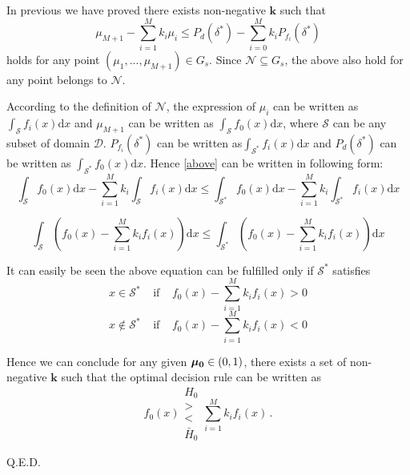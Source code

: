 \documentclass[12pt,journal,a4paper,twoside,onecolumn]{IEEEtran}
\begin{document}
\begin{spacing}{2.5}
In previous we have proved there exists non-negative $\mathbf{k}$ such that 
\begin{equation}
\label{above}
\mu_{M+1} - \sum_{i=1}^{M}k_i\mu_i \leq P_d(\delta^\ast) - \sum_{i=0}^{M}k_iP_{f_i}(\delta^\ast)
\end{equation}
holds for any point $(\mu_1, ..., \mu_{M+1}) \in G_s$. Since $\mathcal{N} \subseteq G_s$, the above also hold for any point belongs to $\mathcal{N}$.

According to the definition of $\mathcal{N}$, the expression of $\mu_i$  can be written as $\int_{\mathcal{S}}f_i(x)\mathrm{d}x$ and $\mu_{M+1}$ can be written as $\int_{\mathcal{S}}f_{0}(x)\mathrm{d}x$, where $\mathcal{S}$ can be any subset of domain $\mathcal{D}$. $P_{f_i}(\delta^\ast)$ can be written as$\int_{\mathcal{S}^\ast}f_i(x)\mathrm{d}x$  and $P_d(\delta^\ast)$ can be written as $\int_{\mathcal{S}^\ast}f_0(x)\mathrm{d}x$. Hence \eqref{above} can be written in following form: 
\[
\int_{\mathcal{S}}f_{0}(x)\mathrm{d}x - \sum_{i=1}^{M}k_i\int_{\mathcal{S}}f_i(x)\mathrm{d}x \leq \int_{\mathcal{S}^\ast}f_{0}(x)\mathrm{d}x - \sum_{i=1}^{M}k_i\int_{\mathcal{S}^\ast}f_i(x)\mathrm{d}x
\]

\[
\int_{\mathcal{S}}(f_{0}(x)- \sum_{i=1}^{M}k_if_{i}(x))\mathrm{d}x \leq \int_{\mathcal{S}^\ast}(f_{0}(x)- \sum_{i=1}^{M}k_if_{i}(x))\mathrm{d}x 
\]

It can easily be seen the above equation can be fulfilled only if $\mathcal{S}^\ast$ satisfies
\[
x \in \mathcal{S}^\ast\;\;\;\;\text{if}\;\;\;\;f_{0}(x)- \sum_{i=1}^{M}k_if_{i}(x) > 0
\]
\[
x \notin \mathcal{S}^\ast\;\;\;\;\text{if}\;\;\;\;f_{0}(x)- \sum_{i=1}^{M}k_if_{i}(x) < 0
\]

Hence we can conclude for any given $\mathbf{\boldsymbol{\mu}_0} \in (0, 1)$, there exists a set of non-negative $\mathbf{k}$ such that 
the optimal decision rule can be written as 
\[
f_0(x) \substack{H_0 \\ > \\ < \\ \bar{H}_0 } \sum_{i=1}^{M}k_if_i(x)\,.
\]

Q.E.D.

\end{spacing}
\end{document}
